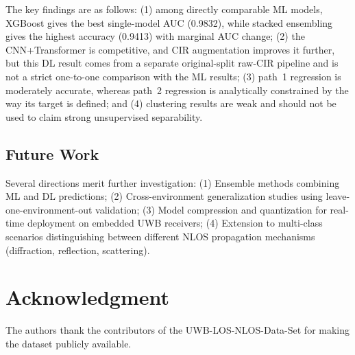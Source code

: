 \documentclass[conference]{IEEEtran}
\begin{document}
The key findings are as follows: (1) among directly comparable ML models, XGBoost gives the best single-model AUC (0.9832), while stacked ensembling gives the highest accuracy (0.9413) with marginal AUC change; (2) the CNN+Transformer is competitive, and CIR augmentation improves it further, but this DL result comes from a separate original-split raw-CIR pipeline and is not a strict one-to-one comparison with the ML results; (3) path~1 regression is moderately accurate, whereas path~2 regression is analytically constrained by the way its target is defined; and (4) clustering results are weak and should not be used to claim strong unsupervised separability.

\subsection{Future Work}

Several directions merit further investigation: (1) Ensemble methods combining ML and DL predictions; (2) Cross-environment generalization studies using leave-one-environment-out validation; (3) Model compression and quantization for real-time deployment on embedded UWB receivers; (4) Extension to multi-class scenarios distinguishing between different NLOS propagation mechanisms (diffraction, reflection, scattering).

\section*{Acknowledgment}

The authors thank the contributors of the UWB-LOS-NLOS-Data-Set for making the dataset publicly available.
\end{document}
